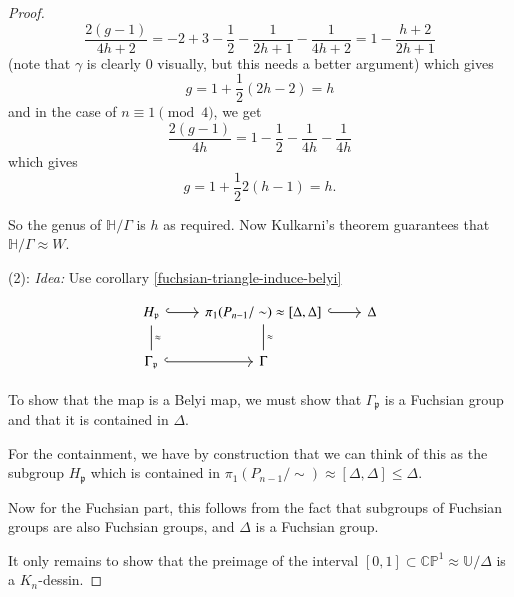 \documentclass[reqno]{amsart}
\theoremstyle{definition}
\theoremstyle{remark}
\begin{document}
\begin{proof}
\[\frac{2 (g-1)}{4h+2} = 
-2 + 3 - \frac{1}{2} - \frac{1}{2h+1} - \frac{1}{4h+2}
= 1 - \frac{h+2}{2h+1}\]
(note that $\gamma$ is clearly $0$ visually, but this needs a better argument) which gives
\[g = 1 + \frac{1}{2} \left( 2h-2 \right)
= h \]
and in the case of $n \equiv 1 \pmod{4}$,
we get
\[\frac{2(g-1)}{4h}
= 1 - \frac{1}{2} - \frac{1}{4h} - \frac{1}{4h}\]
which gives
\[g = 1 + \frac{1}{2} 2(h-1) = h.\]


So the genus of $\mathbb{H}/\Gamma$ is $h$
as required. Now Kulkarni's theorem guarantees that $\mathbb{H}/\Gamma \approx W$.\\
\linebreak







(2): 
\textit{Idea:} Use corollary \ref{fuchsian-triangle-induce-belyi}

\begin{equation*}
            \begin{tikzcd}
                H_{\mathfrak{p}} 
                \ar[d, dash, "\approx"]\ar[r,
                hookrightarrow] & \pi_1 (P_{n-1}/\sim) \approx
                \left[\Delta, \Delta \right]\ar[d, dash, "\approx"]
                \ar[r,hookrightarrow]&
                \Delta
                \\
                \Gamma_{\mathfrak{p}} 
                \ar[r, hookrightarrow]&
                \Gamma
            \end{tikzcd}
        \end{equation*}

        To show that the map is
        a Belyi map, we must show that $\Gamma_{\mathfrak{p}}$ is a Fuchsian group and that it is
        contained in $\Delta$.

        For the containment, we have by
        construction that we can think
        of this as the subgroup
        $H_{\mathfrak{p}}$ which
        is contained in
        $\pi_1 (P_{n-1}/\sim) 
        \approx \left[ \Delta, \Delta
        \right] \leq \Delta$.

        Now for the Fuchsian part, 
        this follows from the fact
        that subgroups of Fuchsian groups
        are also Fuchsian groups, and
        $\Delta$ is a Fuchsian group.

        It only remains
        to show that the preimage
        of the interval
        $\left[ 0,1 \right]
        \subset \mathbb{C}\mathbb{P}^1
        \approx \mathbb{U}/ \Delta$
        is a $K_n$-dessin.

 
    
    








    
\end{proof}
\end{document}
